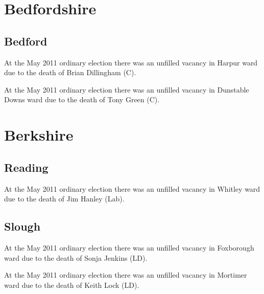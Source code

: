 \begin{resultsiii}
\section{Bedfordshire}

\subsection*{Bedford}


At the May 2011 ordinary election there was an unfilled vacancy in Harpur ward due to the death of Brian Dillingham (C).



At the May 2011 ordinary election there was an unfilled vacancy in Dunstable Downs ward due to the death of Tony Green (C).

\section{Berkshire}

\subsection*{Reading}


At the May 2011 ordinary election there was an unfilled vacancy in Whitley ward due to the death of Jim Hanley (Lab).

\subsection*{Slough}


At the May 2011 ordinary election there was an unfilled vacancy in Foxborough ward due to the death of Sonja Jenkins (LD).



At the May 2011 ordinary election there was an unfilled vacancy in Mortimer ward due to the death of Keith Lock (LD).


\end{resultsiii}
